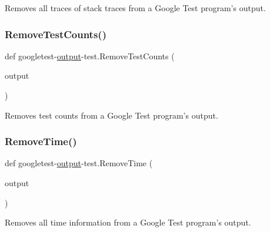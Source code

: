 \begin{DoxyVerb}Removes all traces of stack traces from a Google Test program's output.\end{DoxyVerb}
 \mbox{\label{namespacegoogletest-output-test_a893f0af4d909d6c3a8d02727e43672c3}} 
\subsubsection{\texorpdfstring{RemoveTestCounts()}{RemoveTestCounts()}}
{\footnotesize\ttfamily def googletest-\/\mbox{\hyperlink{namespacegoogletest-output-test_ab3df9ce09186215a36c30454cf282417}{output}}-\/test.\+Remove\+Test\+Counts (\begin{DoxyParamCaption}\item[{}]{output }\end{DoxyParamCaption})}

\begin{DoxyVerb}Removes test counts from a Google Test program's output.\end{DoxyVerb}
 \mbox{\label{namespacegoogletest-output-test_a4f69487747e80f918be30f8fa47ef807}} 
\subsubsection{\texorpdfstring{RemoveTime()}{RemoveTime()}}
{\footnotesize\ttfamily def googletest-\/\mbox{\hyperlink{namespacegoogletest-output-test_ab3df9ce09186215a36c30454cf282417}{output}}-\/test.\+Remove\+Time (\begin{DoxyParamCaption}\item[{}]{output }\end{DoxyParamCaption})}

\begin{DoxyVerb}Removes all time information from a Google Test program's output.\end{DoxyVerb}
 \mbox{\label{namespacegoogletest-output-test_a1a8d86ab15f4cfbbcbebcfc2c8863421}} 
